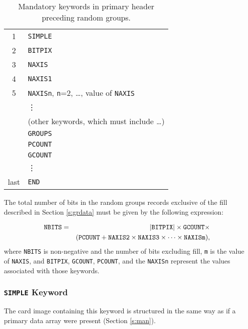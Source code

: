  \begin{table}[htbp]
 \begin{center}
  \begin{tabular}{cl}
     1     & {\tt SIMPLE}  \\
     2     & {\tt BITPIX}  \\
     3     & {\tt NAXIS}  \\
     4     & {\tt NAXIS1}  \\
     5     & {\tt NAXISn}, {\tt n}=2, \ldots, value of {\tt NAXIS}  \\ 
           &  \vdots \\                       
           &  (other keywords, which must include \ldots) \\  
           &  {\tt GROUPS}  \\
           &  {\tt PCOUNT}  \\
           &  {\tt GCOUNT}  \\
           &  \vdots  \\                         
     last  &  {\tt END} \\
   \end{tabular} 
 \end{center}
 \caption{Mandatory keywords in primary header preceding random
groups.} 

 \label{t:hdrrg}                      
\end{table}

 The total number of bits in the random groups records 
 exclusive of the fill described in Section \ref{s:grdata} must be
 given by the following
 expression:

\begin{eqnarray}  
   \mbox{{\tt NBITS}} &=&  
                     |\mbox{{\tt BITPIX}}| \times 
                     \mbox{{\tt GCOUNT}} \times \nonumber \\
                & &  (\mbox{{\tt PCOUNT}} + \mbox{{\tt NAXIS2}} \times 
                 \mbox{{\tt NAXIS3}} \times  \cdots \times \mbox{{\tt
NAXISm}}),
\end{eqnarray}
\noindent
 where {\tt NBITS} is
 non-negative and the number of bits excluding fill, 
 {\tt m} is the value of {\tt NAXIS}, and 
 {\tt BITPIX}, {\tt GCOUNT}, 
 {\tt PCOUNT}, and the {\tt NAXISn}
represent
 the values associated with those keywords.          
 
   \subsubsection{{\tt SIMPLE} Keyword}
   The card image containing this keyword is structured in 
   the same way as if a 
   primary data array 
   were present (Section \ref{s:man}).
  
